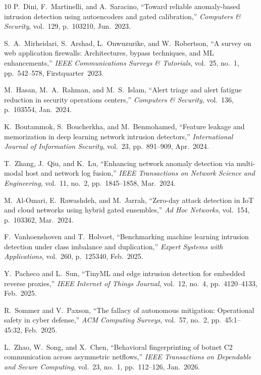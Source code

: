 \documentclass[conference,10pt,twocolumn]{IEEEtran}
\begin{document}
\begin{thebibliography}{10}
P.~Dini, F.~Martinelli, and A.~Saracino, ``Toward reliable anomaly-based intrusion detection using autoencoders and gated calibration,'' \emph{Computers \& Security}, vol.~129, p.~103210, Jun.~2023.

S.~A.~Mirheidari, S.~Arshad, L.~Onwuzurike, and W.~Robertson, ``A survey on web application firewalls: Architectures, bypass techniques, and ML enhancements,'' \emph{IEEE Communications Surveys \& Tutorials}, vol.~25, no.~1, pp.~542--578, Firstquarter~2023.

M.~Hasan, M.~A.~Rahman, and M.~S.~Islam, ``Alert triage and alert fatigue reduction in security operations centers,'' \emph{Computers \& Security}, vol.~136, p.~103554, Jan.~2024.

K.~Boutammok, S.~Boucherkha, and M.~Benmohamed, ``Feature leakage and memorization in deep learning network intrusion detectors,'' \emph{International Journal of Information Security}, vol.~23, pp.~891--909, Apr.~2024.

T.~Zhang, J.~Qiu, and K.~Lu, ``Enhancing network anomaly detection via multi-modal host and network log fusion,'' \emph{IEEE Transactions on Network Science and Engineering}, vol.~11, no.~2, pp.~1845--1858, Mar.~2024.

M.~Al-Omari, E.~Rawashdeh, and M.~Jarrah, ``Zero-day attack detection in IoT and cloud networks using hybrid gated ensembles,'' \emph{Ad Hoc Networks}, vol.~154, p.~103362, Mar.~2024.

F.~Vanhoenshoven and T.~Holvoet, ``Benchmarking machine learning intrusion detection under class imbalance and duplication,'' \emph{Expert Systems with Applications}, vol.~260, p.~125340, Feb.~2025.

Y.~Pacheco and L.~Sun, ``TinyML and edge intrusion detection for embedded reverse proxies,'' \emph{IEEE Internet of Things Journal}, vol.~12, no.~4, pp.~4120--4133, Feb.~2025.

R.~Sommer and V.~Paxson, ``The fallacy of autonomous mitigation: Operational safety in cyber defense,'' \emph{ACM Computing Surveys}, vol.~57, no.~2, pp.~45:1--45:32, Feb.~2025.

L.~Zhao, W.~Song, and X.~Chen, ``Behavioral fingerprinting of botnet C2 communication across asymmetric netflows,'' \emph{IEEE Transactions on Dependable and Secure Computing}, vol.~23, no.~1, pp.~112--126, Jan.~2026.


\end{thebibliography}
\end{document}
